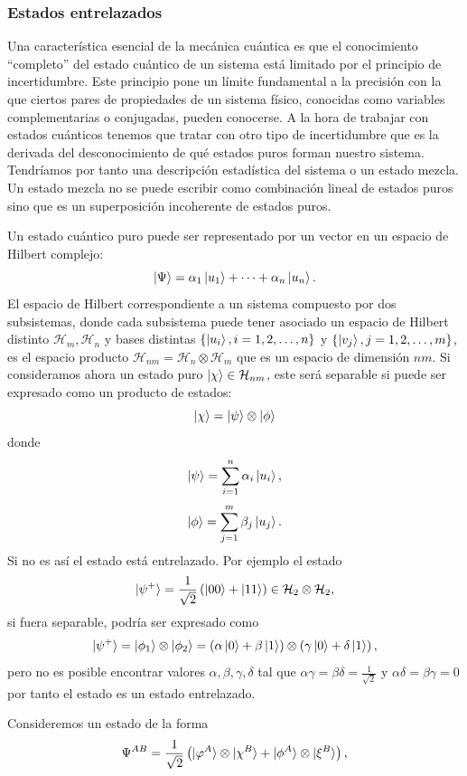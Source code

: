 \documentclass{article}
\theoremstyle{plain}
\theoremstyle{definition}
\begin{document}
	\subsubsection{Estados entrelazados}
	Una característica esencial de la mecánica cuántica es que el conocimiento ``completo'' del estado cuántico de un sistema está limitado por el principio de incertidumbre. Este principio pone un límite fundamental a la precisión con la que ciertos pares de propiedades de un sistema físico, conocidas como variables complementarias o conjugadas, pueden conocerse.
	A la hora de trabajar con estados cuánticos tenemos que tratar con otro tipo de incertidumbre que es la derivada del desconocimiento de qué estados puros forman nuestro sistema. Tendríamos por tanto una descripción estadística del sistema o un estado mezcla. Un estado mezcla no se puede escribir como combinación lineal de estados puros sino que es un superposición incoherente de estados puros.\par
	Un estado cuántico puro puede ser representado por un vector en un espacio de Hilbert complejo: \[\ket{\Psi} = \alpha_1\ket{u_1} +\dots+\alpha_n\ket{u_n}\text{.}  \] 
	El espacio de Hilbert correspondiente a un sistema compuesto por dos subsistemas, donde cada subsistema puede tener asociado un espacio de Hilbert distinto \(\mathcal{H}_m, \mathcal{H}_n \) y bases distintas \(\{\ket{u_i}, i=1,2,\dots,n\} \) y \(\{\ket{v_j}, j=1,2,\dots,m\} \), es el espacio producto \(\mathcal{H}_{nm} = \mathcal{H}_n \otimes \mathcal{H}_m
	\) que es un espacio de dimensión \(nm\).
	Si consideramos ahora un estado puro \(\ket{\chi} \in \mathcal{H}_{nm}\), este será separable si puede ser expresado como un producto de estados:
	\[\ket{\chi} = \ket{\psi}\otimes\ket{\phi} \] donde \[\ket{\psi} = \sum_{i=1}^{n}\alpha_i\ket{u_i}, \]
	\[\ket{\phi} = \sum_{j=1}^{m}\beta_j\ket{u_j}\text{.} \] Si no es así el estado está entrelazado. Por ejemplo el estado \[\ket{\psi^+} = \frac{1}{\sqrt{2}}\left(\ket{00} + \ket{11} \right) \in \mathcal{H}_2\otimes\mathcal{H}_2, \] si fuera separable, podría ser expresado como \[\ket{\psi^+} = \ket{\phi_1}\otimes\ket{\phi_2} = \left(\alpha\ket{0}+\beta\ket{1}\right)\otimes\left(\gamma\ket{0}+\delta\ket{1}\right), \] pero no es posible encontrar valores \(\alpha,\beta,\gamma,\delta \) tal que \(\alpha\gamma = \beta\delta=\frac{1}{\sqrt{2}}\) y \( \alpha\delta=\beta\gamma=0 \) por tanto el estado es un estado entrelazado. \par
	Consideremos un estado de la forma \[\Psi^{AB} = \frac{1}{\sqrt{2}}\left(\ket{\varphi^A}\otimes\ket{\chi^B} + \ket{\phi^A}\otimes\ket{\xi^B} \right), \]
\end{document}
